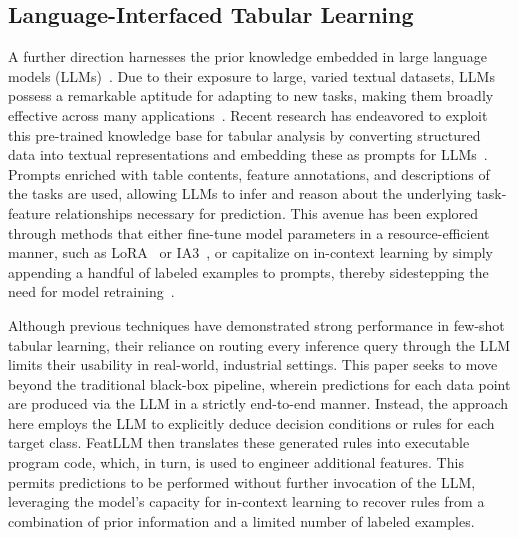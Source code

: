 \subsection{Language-Interfaced Tabular Learning}
A further direction harnesses the prior knowledge embedded in large language models (LLMs)~\cite{anil2023palm,openai2023gpt4}. Due to their exposure to large, varied textual datasets, LLMs possess a remarkable aptitude for adapting to new tasks, making them broadly effective across many applications~\cite{brown2020language}. Recent research has endeavored to exploit this pre-trained knowledge base for tabular analysis by converting structured data into textual representations and embedding these as prompts for LLMs~\cite{dinh2022lift,hegselmann2023tabllm,wang2023anypredict}. Prompts enriched with table contents, feature annotations, and descriptions of the tasks are used, allowing LLMs to infer and reason about the underlying task-feature relationships necessary for prediction. This avenue has been explored through methods that either fine-tune model parameters in a resource-efficient manner, such as LoRA~\cite{hu2021lora} or IA3~\cite{liu2022few}, or capitalize on in-context learning by simply appending a handful of labeled examples to prompts, thereby sidestepping the need for model retraining~\cite{dinh2022lift,hegselmann2023tabllm,nam2023semi,slack2023tablet}.

Although previous techniques have demonstrated strong performance in few-shot tabular learning, their reliance on routing every inference query through the LLM limits their usability in real-world, industrial settings. This paper seeks to move beyond the traditional black-box pipeline, wherein predictions for each data point are produced via the LLM in a strictly end-to-end manner. Instead, the approach here employs the LLM to explicitly deduce decision conditions or rules for each target class. \textsf{FeatLLM} then translates these generated rules into executable program code, which, in turn, is used to engineer additional features. This permits predictions to be performed without further invocation of the LLM, leveraging the model’s capacity for in-context learning to recover rules from a combination of prior information and a limited number of labeled examples.

